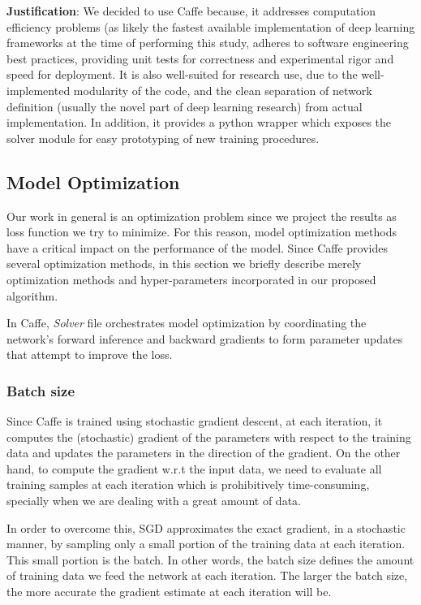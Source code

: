 \textbf{Justification}: We decided to use Caffe because, it addresses computation efficiency problems (as likely the fastest available implementation of deep learning frameworks at the time of performing this study, adheres to software engineering best practices, providing unit tests for correctness and experimental rigor and speed for deployment. It is also well-suited for research use, due to the well-implemented modularity of the code, and the clean separation of network definition (usually the novel part of deep learning research) from actual implementation\cite{jia2014caffe}. In addition, it provides a python wrapper which exposes the solver module for easy prototyping of new training procedures. 

\subsection{Model Optimization}

Our work in general is an optimization problem since we project the results as loss function we try to minimize. For this reason, model optimization methods have a critical impact on the performance of the model. Since Caffe provides several optimization methods, in this section we briefly describe merely optimization methods and hyper-parameters incorporated in our proposed algorithm.  

\indent In Caffe, \textit{Solver} file  orchestrates model optimization by coordinating the network's forward inference and backward gradients to form parameter updates that attempt to improve the loss. 

\subsubsection{Batch size}

Since Caffe is trained using stochastic gradient descent, at each iteration, it computes the (stochastic) gradient of the parameters with respect to the training data and updates the parameters in the direction of the gradient. On the other hand, to compute the gradient w.r.t the input data, we need to evaluate all training samples at each iteration which is prohibitively time-consuming, specially when we are dealing with a great amount of data. 

\indent In order to overcome this, SGD approximates the exact gradient, in a stochastic manner, by sampling only a small portion of the training data at each iteration. This small portion is the batch. In other words, the batch size defines the amount of training data we feed the network at each iteration. The larger the batch size, the more accurate the gradient estimate at each iteration will be. 

